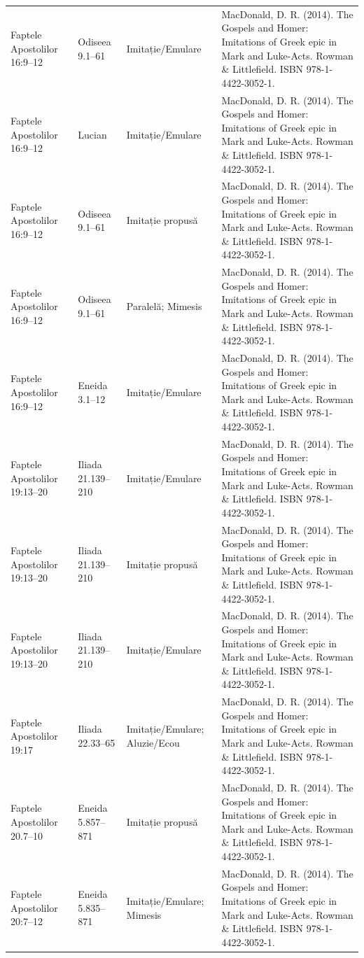 \documentclass[12pt,a4paper,twoside,openany]{book}
\begin{document}
\begin{longtable}{L{1.4cm}L{1.7cm}L{3.1cm}L{8.4cm}}
Faptele Apostolilor 16:9–12 & Odiseea 9.1–61 & Imitație/Emulare & MacDonald, D. R. (2014). The Gospels and Homer: Imitations of Greek epic in Mark and Luke-Acts. Rowman \& Littlefield. ISBN 978-1-4422-3052-1. \\
Faptele Apostolilor 16:9–12 & Lucian & Imitație/Emulare & MacDonald, D. R. (2014). The Gospels and Homer: Imitations of Greek epic in Mark and Luke-Acts. Rowman \& Littlefield. ISBN 978-1-4422-3052-1. \\
Faptele Apostolilor 16:9–12 & Odiseea 9.1–61 & Imitație propusă & MacDonald, D. R. (2014). The Gospels and Homer: Imitations of Greek epic in Mark and Luke-Acts. Rowman \& Littlefield. ISBN 978-1-4422-3052-1. \\
Faptele Apostolilor 16:9–12 & Odiseea 9.1–61 & Paralelă; Mimesis & MacDonald, D. R. (2014). The Gospels and Homer: Imitations of Greek epic in Mark and Luke-Acts. Rowman \& Littlefield. ISBN 978-1-4422-3052-1. \\
Faptele Apostolilor 16:9–12 & Eneida 3.1–12 & Imitație/Emulare & MacDonald, D. R. (2014). The Gospels and Homer: Imitations of Greek epic in Mark and Luke-Acts. Rowman \& Littlefield. ISBN 978-1-4422-3052-1. \\
Faptele Apostolilor 19:13–20 & Iliada 21.139–210 & Imitație/Emulare & MacDonald, D. R. (2014). The Gospels and Homer: Imitations of Greek epic in Mark and Luke-Acts. Rowman \& Littlefield. ISBN 978-1-4422-3052-1. \\
Faptele Apostolilor 19:13–20 & Iliada 21.139–210 & Imitație propusă & MacDonald, D. R. (2014). The Gospels and Homer: Imitations of Greek epic in Mark and Luke-Acts. Rowman \& Littlefield. ISBN 978-1-4422-3052-1. \\
Faptele Apostolilor 19:13–20 & Iliada 21.139–210 & Imitație/Emulare & MacDonald, D. R. (2014). The Gospels and Homer: Imitations of Greek epic in Mark and Luke-Acts. Rowman \& Littlefield. ISBN 978-1-4422-3052-1. \\
Faptele Apostolilor 19:17 & Iliada 22.33–65 & Imitație/Emulare; Aluzie/Ecou & MacDonald, D. R. (2014). The Gospels and Homer: Imitations of Greek epic in Mark and Luke-Acts. Rowman \& Littlefield. ISBN 978-1-4422-3052-1. \\
Faptele Apostolilor 20.7–10 & Eneida 5.857–871 & Imitație propusă & MacDonald, D. R. (2014). The Gospels and Homer: Imitations of Greek epic in Mark and Luke-Acts. Rowman \& Littlefield. ISBN 978-1-4422-3052-1. \\
Faptele Apostolilor 20:7–12 & Eneida 5.835–871 & Imitație/Emulare; Mimesis & MacDonald, D. R. (2014). The Gospels and Homer: Imitations of Greek epic in Mark and Luke-Acts. Rowman \& Littlefield. ISBN 978-1-4422-3052-1. \\

\end{longtable}
\end{document}
